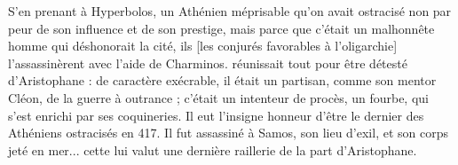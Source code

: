 {{{S'en prenant à Hyperbolos, un Athénien méprisable qu'on avait ostracisé non par peur de son influence et de son prestige, mais parce que c'était un malhonnête homme qui déshonorait la cité, ils [les conjurés favorables à l'oligarchie] l'assassinèrent avec l'aide de Charminos.}} réunissait tout pour être détesté d'Aristophane : de caractère exécrable, il était un partisan, comme son mentor Cléon, de la guerre à outrance ; c'était un intenteur de procès, un fourbe, qui s'est enrichi par ses coquineries. Il eut l'insigne honneur d'être le dernier des Athéniens ostracisés en 417. Il fut assassiné à Samos, son lieu d'exil, et son corps jeté en mer... cette  lui valut une dernière raillerie de la part d'Aristophane. 
}
